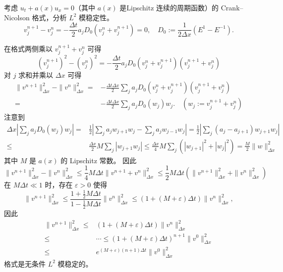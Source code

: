 \begin{example}
    考虑 $u_t + a(x) u_x = 0$（其中 $a(x)$ 是Lipschitz 连续的周期函数）的 Crank–Nicolson 格式，分析 $L^2$ 模稳定性。
    \[
        v_j^{n+1}-v_j^n = - \frac{\Delta t}{2} a_j D_0(v_j^n + v_j^{n+1}) = 0,\quad
        D_0 := \frac1{2\Delta x}(E^1-E^{-1}).
    \]
\end{example}

\begin{solution*}
    在格式两侧乘以 $v_j^{n+1} + v_j^n$ 可得
    \[
        (v_j^{n+1})^2 - (v_j^n)^2 = - \frac{\Delta t}{2} a_j D_0(v_j^n + v_j^{n+1})(v_j^{n+1} + v_j^n)
    \]
    对 $j$ 求和并乘以 $\Delta x$ 可得
    \begin{align*}
        \|v^{n+1}\|_{\Delta x}^2 - \|v^{n}\|_{\Delta x}^2 ={}
            & - \frac{\Delta t \Delta x}{2} \sum_j a_j D_0(v_j^n + v_j^{n+1})(v_j^{n+1} + v_j^n)      \\
        ={} & - \frac{\Delta t \Delta x}{2} \sum_j a_j D_0(w_j) w_j. \quad (w_j := v_j^{n+1} + v_j^n)
    \end{align*}
    注意到
    \begin{align*}
        \Delta x \left| \sum_j a_j D_0(w_j) w_j \right|
        ={}   &
        \frac1{2} \left|
        \sum_j a_j w_{j+1} w_j - \sum_j a_j w_{j-1} w_j
        \right| =
        \frac1{2} \left|
        \sum_j (a_j-a_{j+1}) w_{j+1} w_j
        \right|
        \\
        \le{} & \frac{\Delta x}2 M
        \sum_j \left|w_{j+1} w_j\right|
        \le  \frac{\Delta x}4 M
        \sum_j \left(|w_{j+1}|^2 + |w_j|^2 \right)
        = \frac{M}{2} \|w\|_{\Delta x}^2
    \end{align*}
    其中 $M$ 是 $a(x)$ 的 Lipschitz 常数。
    因此
    \[
        \|v^{n+1}\|_{\Delta x}^2 - \|v^{n}\|_{\Delta x}^2
        \le \frac{1}{4} M \Delta t \|v^{n+1} + v^n\|_{\Delta x}^2
        \le \frac{1}{2} M \Delta t \left( \|v^{n+1} \|_{\Delta x}^2 +  \|v^{n} \|_{\Delta x}^2\right)
    \]
    在 $M \Delta t \ll 1$ 时，存在 $\varepsilon > 0$ 使得
    \[
        \|v^{n+1}\|_{\Delta x}^2 \le
        \frac{1+\frac{1}{2} M \Delta t}{1-\frac{1}{2} M \Delta t} \|v^{n}\|_{\Delta x}^2
        \le (1 + (M+\varepsilon) \Delta t) \|v^{n}\|_{\Delta x}^2,
    \]
    因此
    \begin{align*}
        \|v^{n+1}\|_{\Delta x}^2 \le{} & (1 + (M+\varepsilon) \Delta t) \|v^{n}\|_{\Delta x}^2                  \\
        \le{}                          & \cdots \le (1 + (M+\varepsilon) \Delta t)^{n+1} \|v^{0}\|_{\Delta x}^2 \\
        \le{}                          & e^{(M+\varepsilon) (n+1)\Delta t} \|v^{0}\|_{\Delta x}^2
    \end{align*}
    格式是无条件 $L^2$ 模稳定的。
\end{solution*}

